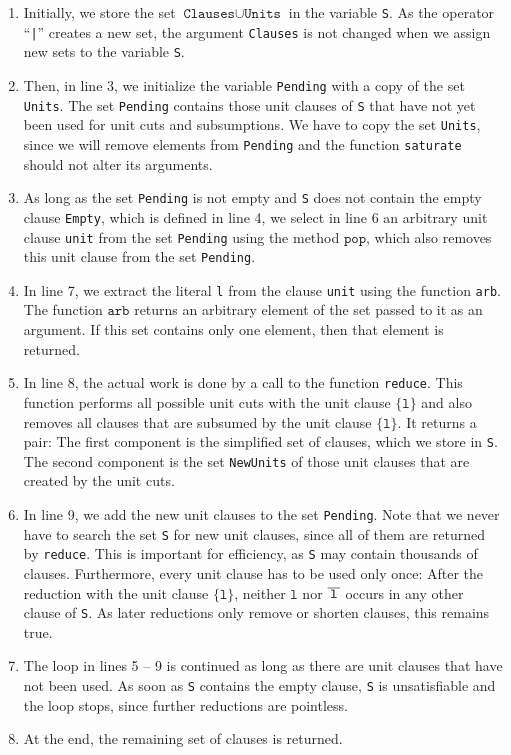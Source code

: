 \begin{enumerate}
\item Initially, we store the set $\texttt{Clauses} \cup \texttt{Units}$ in the variable \texttt{S}.
      As the operator ``\texttt{|}'' creates a new set, the argument \texttt{Clauses} is not changed when we
      assign new sets to the variable \texttt{S}.
\item Then, in line 3, we initialize the variable \texttt{Pending} with a copy of the set \texttt{Units}.
      The set \texttt{Pending} contains those unit clauses of \texttt{S} that have not yet been used for unit cuts
      and subsumptions.  We have to copy the set \texttt{Units}, since we will remove elements from
      \texttt{Pending} and the function \texttt{saturate} should not alter its arguments.
\item As long as the set \texttt{Pending} is not empty and \texttt{S} does not contain the empty clause
      \texttt{Empty}, which is defined in line 4, we select in line 6 an arbitrary unit clause \texttt{unit} from the set \texttt{Pending} using the method
      $\texttt{pop}$, which also removes this unit clause from the set \texttt{Pending}.
\item In line 7, we extract the literal \texttt{l} from the clause
      \texttt{unit} using the function \texttt{arb}. The function $\texttt{arb}$ returns an arbitrary element of the set passed to it as an argument. If this set contains only one element, then
      that element is returned.
\item In line 8, the actual work is done by a call to the function
      \texttt{reduce}. This function performs all possible unit cuts with the
      unit clause $\{\texttt{l}\}$ and also removes all clauses that
      are subsumed by the unit clause $\{\texttt{l}\}$.  It returns a pair: The first component is the
      simplified set of clauses, which we store in \texttt{S}.  The second component is the set
      \texttt{NewUnits} of those unit clauses that are created by the unit cuts.
\item In line 9, we add the new unit clauses to the set \texttt{Pending}.  Note that we never have to search
      the set \texttt{S} for new unit clauses, since all of them are returned by \texttt{reduce}.  This is
      important for efficiency, as \texttt{S} may contain thousands of clauses.  Furthermore, every unit clause
      has to be used only once:  After the reduction with the unit clause $\{\texttt{l}\}$, neither
      $\texttt{l}$ nor $\overline{\,\texttt{l}\,}$ occurs in any other clause of \texttt{S}.  As later reductions
      only remove or shorten clauses, this remains true.
\item The loop in lines 5 -- 9 is continued as long as there are
      unit clauses that have not been used.  As soon as \texttt{S} contains the empty clause, \texttt{S} is
      unsatisfiable and the loop stops, since further reductions are pointless.
\item At the end, the remaining set of clauses is returned.
\end{enumerate}
